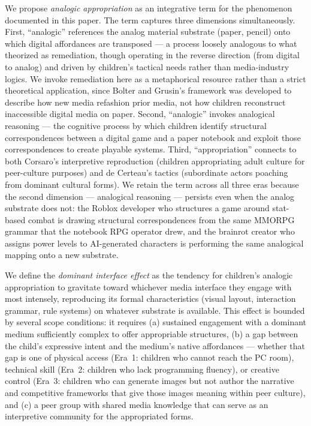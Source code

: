 \documentclass[12pt]{article}
\begin{document}
We propose \emph{analogic appropriation} as an integrative term for the phenomenon documented in this paper. The term captures three dimensions simultaneously. First, ``analogic'' references the analog material substrate (paper, pencil) onto which digital affordances are transposed --- a process loosely analogous to what \citet{bolter1999} theorized as remediation, though operating in the reverse direction (from digital to analog) and driven by children's tactical needs rather than media-industry logics. We invoke remediation here as a metaphorical resource rather than a strict theoretical application, since Bolter and Grusin's framework was developed to describe how new media refashion prior media, not how children reconstruct inaccessible digital media on paper. Second, ``analogic'' invokes analogical reasoning --- the cognitive process by which children identify structural correspondences between a digital game and a paper notebook and exploit those correspondences to create playable systems. Third, ``appropriation'' connects to both Corsaro's interpretive reproduction (children appropriating adult culture for peer-culture purposes) and de Certeau's tactics (subordinate actors poaching from dominant cultural forms). We retain the term across all three eras because the second dimension --- analogical reasoning --- persists even when the analog substrate does not: the Roblox developer who structures a game around stat-based combat is drawing structural correspondences from the same MMORPG grammar that the notebook RPG operator drew, and the brainrot creator who assigns power levels to AI-generated characters is performing the same analogical mapping onto a new substrate.

We define the \emph{dominant interface effect} as the tendency for children's analogic appropriation to gravitate toward whichever media interface they engage with most intensely, reproducing its formal characteristics (visual layout, interaction grammar, rule systems) on whatever substrate is available. This effect is bounded by several scope conditions: it requires (a) sustained engagement with a dominant medium sufficiently complex to offer appropriable structures, (b) a gap between the child's expressive intent and the medium's native affordances --- whether that gap is one of physical access (Era~1: children who cannot reach the PC room), technical skill (Era~2: children who lack programming fluency), or creative control (Era~3: children who can generate images but not author the narrative and competitive frameworks that give those images meaning within peer culture), and (c) a peer group with shared media knowledge that can serve as an interpretive community for the appropriated forms.
\end{document}
